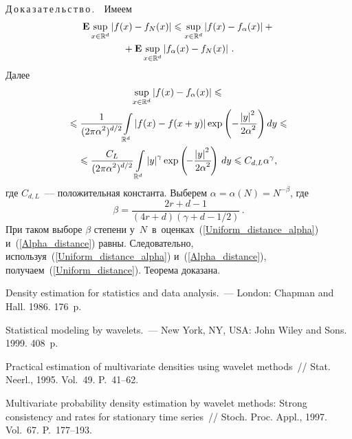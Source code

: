 \begin{multicols}{2}
\smallskip

\noindent
Д\,о\,к\,а\,з\,а\,т\,е\,л\,ь\,с\,т\,в\,о\,.\ \ Имеем
\begin{multline*}
\mathbf{E}\sup\limits_{x\in \mathbb{R}^d}\left\vert f(x)-f_{N}(x)\right\vert\leqslant
\sup\limits_{x\in \mathbb{R}^d}\left\vert f(x)-f_\alpha(x)\right\vert+{}\\
{}+
\mathbf{E}\sup\limits_{x\in \mathbb{R}^d}\left\vert f_\alpha(x)-f_{N}(x)\right\vert\,.
\end{multline*}
Далее
\begin{multline}
\sup\limits_{x\in \mathbb{R}^d}\left\vert f(x)-f_\alpha(x)\right\vert\leqslant{}\\
{}\leqslant
\displaystyle\frac{\displaystyle 1\mathstrut}{\displaystyle (2\pi\alpha^2)^{d/2}\mathstrut}\!\int\limits_{\mathbb{R}^d}\left\vert f(x)-f(x+y)\right\vert
\exp\left(-\displaystyle\frac{\displaystyle \left\vert y\right\vert^2\mathstrut}{\displaystyle 2\alpha^2\mathstrut}\right)dy\leqslant{}
\\
\hspace*{-1mm}\leqslant\displaystyle\frac{\displaystyle C_L\mathstrut}{\displaystyle (2\pi\alpha^2)^{d/2}\mathstrut}\int\limits_{\mathbb{R}^d}
\left\vert y\right\vert^\gamma\exp\left(\!
-\displaystyle\frac{\displaystyle \left\vert y\right\vert^2\mathstrut}{\displaystyle 2\alpha^2\mathstrut}\!\right)\,dy\leqslant C_{d,L}\alpha^{\gamma},\!\!
\label{Alpha_distance}
\end{multline}
где $C_{d,L}$~--- положительная константа.
Выберем $\alpha=\alpha(N)=N^{-\beta}$, где
\begin{equation*}
\beta=\frac{2r+d-1}{(4r+d)(\gamma+d-1/2)}\,.
\end{equation*}
При таком выборе $\beta$ степени у~$N$~в~оценках~(\ref{Uniform_distance_alpha})
и~(\ref{Alpha_distance}) равны. Следовательно,
используя~(\ref{Uniform_distance_alpha}) и~(\ref{Alpha_distance}),
получаем~(\ref{Uniform_distance}). Теорема доказана.


{\small\frenchspacing
 {%
 \begin{thebibliography}{99}

 Density estimation for statistics and data analysis.~---
London: Chapman and Hall. 1986. 176~p.
\par
{}
 Statistical modeling by wavelets.~--- New York, NY,
USA: John Wiley and Sons.
1999. 408~p.


 Practical estimation of multivariate densities using
wavelet methods~// Stat. Neerl., 1995. Vol.~49. P.~41--62.

 Multivariate probability density estimation by wavelet
methods: Strong consistency and rates for stationary time series~//
Stoch. Proc. Appl., 1997. Vol.~67. P.~177--193.


\end{thebibliography}}}
\end{multicols}

